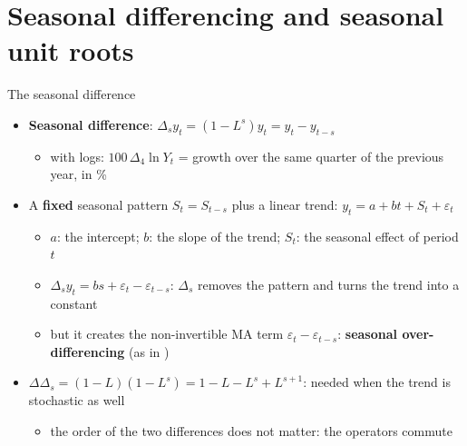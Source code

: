 \section{Seasonal differencing and seasonal unit roots}

\begin{frame}{The seasonal difference}
\itemsize{\small}
\begin{itemize}
    \item \textbf{Seasonal difference}: $\Delta_s y_t = (1 - L^s)y_t = y_t - y_{t-s}$
    \begin{itemize}
        \item with logs: $100\,\Delta_4\ln Y_t$ = growth over the same quarter of the previous year, in \%
    \end{itemize}
    \item A \textbf{fixed} seasonal pattern $S_t = S_{t-s}$ plus a linear trend: $y_t = a + bt + S_t + \varepsilon_t$
    \begin{itemize}
        \item $a$: the intercept; $b$: the slope of the trend; $S_t$: the seasonal effect of period $t$
        \item $\Delta_s y_t = bs + \varepsilon_t - \varepsilon_{t-s}$: $\Delta_s$ removes the pattern and turns the trend into a constant
        \item but it creates the non-invertible MA term $\varepsilon_t - \varepsilon_{t-s}$: \textbf{seasonal over-differencing} (as in )
    \end{itemize}
    \item $\Delta\Delta_s = (1 - L)(1 - L^s) = 1 - L - L^s + L^{s+1}$: needed when the trend is stochastic as well
    \begin{itemize}
        \item the order of the two differences does not matter: the operators commute
    \end{itemize}
\end{itemize}
\end{frame}

